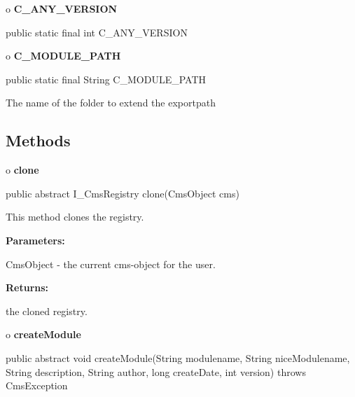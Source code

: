 o {\bf C\_ANY\_VERSION} 

\begin{PRE}
 public static final int C\_ANY\_VERSION
\end{PRE}

o {\bf C\_MODULE\_PATH} 

\begin{PRE}
 public static final String C\_MODULE\_PATH
\end{PRE}

\begin{description}
\htmlDD The name of the folder to extend the exportpath

\end{description}

\subsection*{  Methods }

o {\bf clone} 

\begin{PRE}
 public abstract I\_CmsRegistry clone(CmsObject cms)
\end{PRE}

\begin{description}
\htmlDD This method clones the registry. 

\begin{description}
\item {\bf Parameters:}  

CmsObject - the current cms-object for the user.  
\item {\bf Returns:}  

the cloned registry.  
\end{description}

\end{description}

o {\bf createModule} 

\begin{PRE}
 public abstract void createModule(String modulename,
                                   String niceModulename,
                                   String description,
                                   String author,
                                   long createDate,
                                   int version) throws CmsException
\end{PRE}

